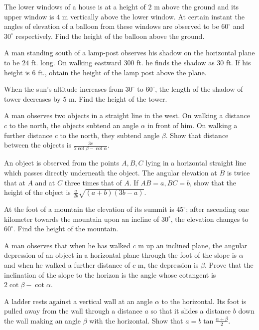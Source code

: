 \item The lower windows of a house is at a height of $2$ m above the ground and its upper window is $4$ m vertically
  above the lower window. At certain instant the angles of elevation of a balloon from these windows are observed to be
  $60^\circ$ and $30^\circ$ respectively. Find the height of the balloon above the ground.

\item A man standing south of a lamp-post observes his shadow on the horizontal plane to be $24$ ft. long. On walking eastward
  $300$ ft. he finds the shadow as $30$ ft. If his height is $6$ ft., obtain the height of the lamp post above
  the plane.

\item When the sun's altitude increases from $30^\circ$ to $60^\circ$, the length of the shadow of tower decreases by
  $5$ m. Find the height of the tower.

\item A man observes two objects in a straight line in the west. On walking a distance $c$ to the north, the objects subtend
  an angle $\alpha$ in front of him. On walking a further distance $c$ to the north, they subtend angle
  $\beta$. Show that distance between the objects is $\frac{3c}{2\cot\beta - \cot\alpha}$.

\item An object is observed from the points $A, B, C$ lying in a horizontal straight line which passes directly underneath the
  object. The angular elevation at $B$ is twice that at $A$ and at $C$ three times that of $A$. If
  $AB = a, BC = b$, show that the height of the object is $\frac{a}{2b}\sqrt{(a + b)(3b - a)}$.

\item At the foot of a mountain the elevation of its summit is $45^\circ$; after ascending one kilometer towards the mountain
  upon an incline of $30^\circ$, the elevation changes to $60^\circ$. Find the height of the mountain.

\item A man observes that when he has walked $c$ m up an inclined plane, the angular depression of an object in a horizontal
  plane through the foot of the slope is $\alpha$ and when he walked a further distance of $c$ m, the depression is
  $\beta$. Prove that the inclination of the slope to the horizon is the angle whose cotangent is $2\cot\beta -
  \cot\alpha$.

\item A ladder rests against a vertical wall at an angle $\alpha$ to the horizontal. Its foot is pulled away from the wall
  through a distance $a$ so that it slides a distance $b$ down the wall making an angle $\beta$ with the
  horizontal. Show that $a = b\tan\frac{\alpha + \beta}{2}$.

